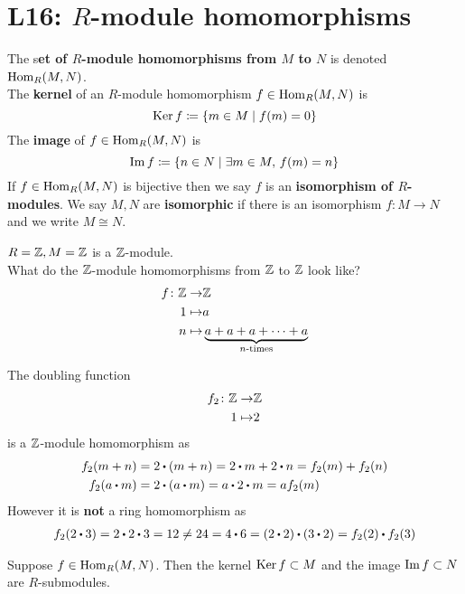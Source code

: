 \documentclass[../Main.tex]{subfiles}
\begin{document}
\chapter{L16: \texorpdfstring{$R$}{R}-module homomorphisms}
\begin{dfn}[title = {\texorpdfstring{$\Hom_R(M,N)$}{Hom}, Kernel, Image, Isomorphism}]
The s\textbf{et of $R$-module homomorphisms from $M$ to $N$} is denoted $\Hom_R(M,N)$.\\
The \textbf{kernel} of an $R$-module homomorphism $f\in \operatorname{Hom}_R(M,N)$ is 
\[\operatorname{Ker} f \coloneqq \{m\in M \mid f(m)=0\}\]
The \textbf{image} of $f\in \operatorname{Hom}_R(M,N)$ is
\[\operatorname{Im} f \coloneqq \{n\in N\mid \exists m\in M, \, f(m)=n\}\]
If $f\in\operatorname{Hom}_R(M,N)$ is bijective then we say $f$ is an \textbf{isomorphism of $R$-modules}. We say $M,N$ are \textbf{isomorphic} if there is an isomorphism $f\colon M\to N$ and we write $M\cong N$.
\end{dfn}
\begin{example}
	$R=\mathbb{Z},M=\mathbb{Z}$ is a $\mathbb{Z}$-module.\\
	What do the $\mathbb{Z}$-module homomorphisms from $\mathbb{Z}$ to $\mathbb{Z}$ look like?
	\begin{align*}
	f\colon \mathbb{Z} \to& \mathbb{Z} \\
	1\mapsto& a \\
	n\mapsto& \underbrace{a+a+a+\dots+a}_{n\text{-times}}
	\end{align*}
\end{example}
\Note The doubling function
\begin{align*}
f_2\colon \mathbb{Z}\to& \mathbb{Z} \\
1\mapsto& 2
\end{align*}
is a $\mathbb{Z}$-module homomorphism as
\begin{align*}
f_2(m+n)&=2\rdot (m+n)=2\rdot m+2\rdot n = f_2(m)+f_2(n)\\
f_2(a\rdot m)&=2\rdot (a\rdot m) = a\rdot 2\rdot m = af_2(m)
\end{align*}
However it is \textbf{not} a ring homomorphism as
\begin{align*}
f_2(2\rdot 3) = 2\rdot 2\rdot 3 =12 \ne 24 = 4\rdot 6 = (2\rdot 2) \rdot  (3\rdot 2) = f_2(2)\rdot f_2(3)
\end{align*}
\begin{prop}[title = Kernel and Image are submodules]
	Suppose $f\in \operatorname{Hom}_R(M,N)$. Then the kernel $\operatorname{Ker} f \subset M$ and the image $\operatorname{Im} f \subset N$ are $R$-submodules.
\end{prop}
\end{document}
